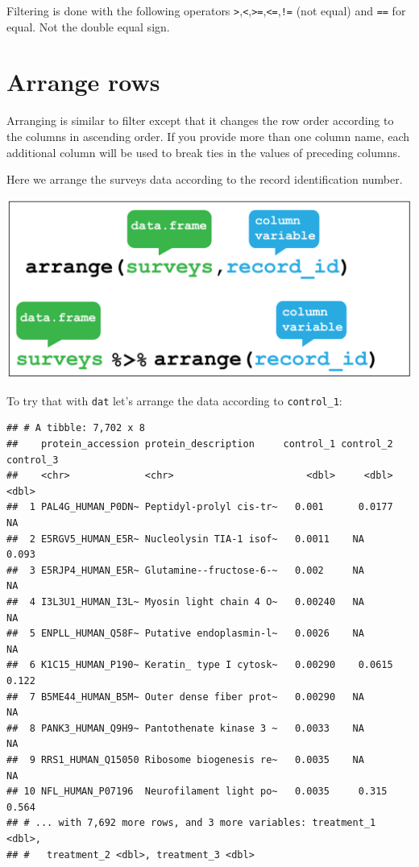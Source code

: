 \documentclass[12pt,]{book}
\newenvironment{Shaded}{\begin{snugshade}}{\end{snugshade}}
\newcommand{\KeywordTok}[1]{\textcolor[rgb]{0.13,0.29,0.53}{\textbf{#1}}}
\newcommand{\DecValTok}[1]{\textcolor[rgb]{0.00,0.00,0.81}{#1}}
\newcommand{\StringTok}[1]{\textcolor[rgb]{0.31,0.60,0.02}{#1}}
\newcommand{\OperatorTok}[1]{\textcolor[rgb]{0.81,0.36,0.00}{\textbf{#1}}}
\newcommand{\NormalTok}[1]{#1}
\theoremstyle{definition}
\theoremstyle{definition}
\theoremstyle{definition}
\theoremstyle{remark}
\begin{document}
Filtering is done with the following operators
\texttt{\textgreater{}},\texttt{\textless{}},\texttt{\textgreater{}=},\texttt{\textless{}=},\texttt{!=}
(not equal) and \texttt{==} for equal. Not the double equal sign.

\section{Arrange rows}\label{arrange-rows}

Arranging is similar to filter except that it changes the row order
according to the columns in ascending order. If you provide more than
one column name, each additional column will be used to break ties in
the values of preceding columns.

Here we arrange the surveys data according to the record identification
number.

\begin{center}\includegraphics[width=0.8\linewidth]{img/dplyr_arrange} \end{center}

To try that with \texttt{dat} let's arrange the data according to
\texttt{control\_1}:

\begin{Shaded}
\end{Shaded}

\begin{verbatim}
## # A tibble: 7,702 x 8
##    protein_accession protein_description     control_1 control_2 control_3
##    <chr>             <chr>                       <dbl>     <dbl>     <dbl>
##  1 PAL4G_HUMAN_P0DN~ Peptidyl-prolyl cis-tr~   0.001      0.0177    NA    
##  2 E5RGV5_HUMAN_E5R~ Nucleolysin TIA-1 isof~   0.0011    NA          0.093
##  3 E5RJP4_HUMAN_E5R~ Glutamine--fructose-6-~   0.002     NA         NA    
##  4 I3L3U1_HUMAN_I3L~ Myosin light chain 4 O~   0.00240   NA         NA    
##  5 ENPLL_HUMAN_Q58F~ Putative endoplasmin-l~   0.0026    NA         NA    
##  6 K1C15_HUMAN_P190~ Keratin_ type I cytosk~   0.00290    0.0615     0.122
##  7 B5ME44_HUMAN_B5M~ Outer dense fiber prot~   0.00290   NA         NA    
##  8 PANK3_HUMAN_Q9H9~ Pantothenate kinase 3 ~   0.0033    NA         NA    
##  9 RRS1_HUMAN_Q15050 Ribosome biogenesis re~   0.0035    NA         NA    
## 10 NFL_HUMAN_P07196  Neurofilament light po~   0.0035     0.315      0.564
## # ... with 7,692 more rows, and 3 more variables: treatment_1 <dbl>,
## #   treatment_2 <dbl>, treatment_3 <dbl>
\end{verbatim}
\end{document}
